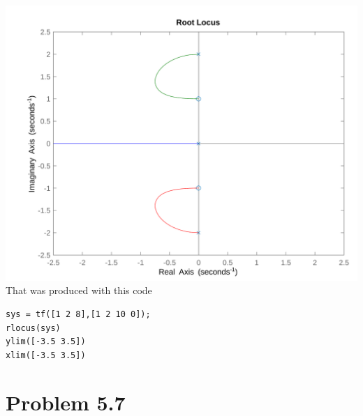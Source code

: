 \documentclass[12pt]{article}
\begin{document}
\includegraphics[scale=.15]{Problem1Matlab2.png}
\\That was produced with this code
\begin{verbatim}
sys = tf([1 2 8],[1 2 10 0]);
rlocus(sys)
ylim([-3.5 3.5])
xlim([-3.5 3.5])
\end{verbatim}
\section*{Problem 5.7}
\end{document}
